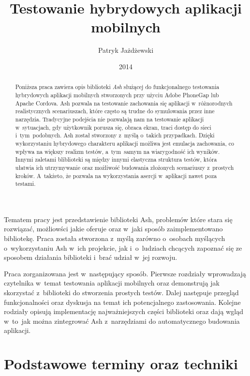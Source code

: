 \documentclass[brudnopis]{xmgr}
\author   {Patryk Jażdżewski}
\title    {Testowanie hybrydowych aplikacji mobilnych}
\date     {2014}
\begin{document}
\begin{abstract}
  Poniższa praca zawiera opis biblioteki \textit{Ash} służącej do funkcjonalnego testowania
hybrydowych aplikacji mobilnych stworzonych przy użyciu Adobe PhoneGap lub
Apache Cordova. Ash pozwala na testowanie zachowania się aplikacji w~różnorodnych
realistycznych scenariuszach, które często są trudne do symulowania przez inne narzędzia. Tradycyjne podejścia nie pozwalają nam na testowanie aplikacji w~sytuacjach, gdy  użytkownik porusza się,
obraca ekran, traci dostęp do sieci i~tym~podobnych. Ash został stworzony z~myślą o~takich przypadkach. Dzięki wykorzystaniu hybrydowego charakteru aplikacji
możliwa jest emulacja zachowania, co wpływa na większy realizm testów, a~tym~samym na wiarygodność ich wyników. Innymi
zaletami bliblioteki są między innymi elastyczna struktura testów, która ułatwia ich utrzymywanie oraz możliwość budowania złożonych scenariuszy z~prostych kroków. 
A~takżeto, że pozwala na wykorzystania asercji w~aplikacji nawet poza testami. 

\end{abstract}

\maketitle

\introduction

Tematem pracy jest przedstawienie biblioteki Ash, problemów które stara się rozwiązać, możliowści jakie oferuje oraz w~jaki sposób zaimplementowano bibliotekę. Praca została stworzona z~myślą zarówno o~osobach myślących o~wykorzystaniu Ash w~ich projekcie, jak i~o~ludziach chcących zapoznać się ze sposobem działania biblioteki i~brać udział w~jej rozwoju.  

Praca zorganizowana jest w~następujący sposób. Pierwsze rozdziały wprowadzają czytelnika w~temat testowania aplikacji mobilnych oraz demonstrują jak skorzystać z~biblioteki do stworzenia prostych testów. Dalej następuje przegląd funkcjonalności oraz dyskusja na temat ich potencjalnego zastosowania. Kolejne rodziały opisują implementację najważniejszych części biblioteki oraz dają wgląd w~to~jak można zintegrować Ash z~narzędziami do automatycznego budowania aplikacji.

\chapter{Podstawowe terminy oraz techniki}
\end{document}
